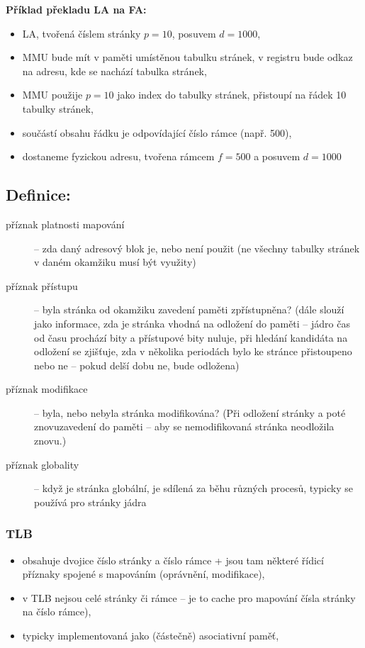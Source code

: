 \documentclass[a4paper, 11pt]{article}
\begin{document}
\textbf{Příklad překladu LA na FA:}
\begin{itemize}
    \item LA, tvořená číslem stránky $p=10$, posuvem $d=1000$,
    \item MMU bude mít v paměti umístěnou tabulku stránek, v registru bude odkaz na adresu, kde se nachází tabulka stránek,
    \item MMU použije $p=10$ jako index do tabulky stránek, přistoupí na řádek 10 tabulky stránek,
    \item součástí obsahu řádku je odpovídající číslo rámce (např. 500),
    \item dostaneme fyzickou adresu, tvořena rámcem $f=500$ a posuvem $d=1000$
\end{itemize}

\subsection*{Definice:}
\begin{description}
\item[příznak platnosti mapování] --  zda daný adresový blok je, nebo není použit (ne všechny tabulky stránek v daném okamžiku musí být využity)

\item[příznak přístupu] -- byla stránka od okamžiku zavedení paměti zpřístupněna? (dále slouží jako informace, zda je stránka vhodná na odložení do paměti -- jádro čas od času prochází bity a přístupové bity nuluje, při hledání kandidáta na odložení se zjišťuje, zda v několika periodách bylo ke stránce přistoupeno nebo ne -- pokud delší dobu ne, bude odložena)

\item[příznak modifikace] -- byla, nebo nebyla stránka modifikována? (Při odložení stránky a poté znovuzavedení do paměti -- aby se nemodifikovaná stránka neodložila znovu.)

\item[příznak globality] -- když je stránka globální, je sdílená za běhu různých procesů, typicky se používá pro stránky jádra
\end{description}

\subsubsection{TLB}
\begin{itemize}
    \item obsahuje dvojice číslo stránky a číslo rámce + jsou tam některé řídicí příznaky spojené s mapováním (oprávnění, modifikace),
    \item v TLB nejsou celé stránky či rámce -- je to cache pro mapování čísla stránky na číslo rámce),
    \item typicky implementovaná jako (částečně) asociativní paměť,
\end{itemize}
 
\end{document}
